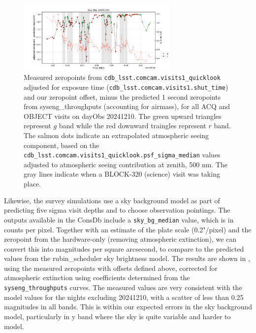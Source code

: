 \begin{figure}
    \centering
    \includegraphics[width=0.7\textwidth]{sp/zeropoints_dayobs_20241210.png}
    \caption{Measured zeropoints from \texttt{cdb\_lsst.comcam.visits1\_quicklook} adjusted for exposure time (\texttt{cdb\_lsst.comcam.visits1.shut\_time}) and our zeropoint offset, minus the predicted 1 second zeropoints from syseng\_throughputs (accounting for airmass), for all ACQ and OBJECT visits on dayObs 20241210. The green upward triangles represent $g$ band while the red downward traingles represent $r$ band. The salmon dots indicate an extrapolated atmospheric seeing component, based on the \texttt{cdb\_lsst.comcam.visits1\_quicklook.psf\_sigma\_median} values adjusted to atmospheric seeing contribution at zenith, 500 nm. The gray lines indicate when a BLOCK-320 (science) visit was taking place. }
    \label{fig:zeropoints_dayobs_20241210}
    \end{figure}


Likewise, the survey simulations use a sky background model as part of predicting five sigma visit depths and to choose observation pointings. The outputs available in the ConsDb include a \texttt{sky\_bg\_median} value, which is in counts per pixel. Together with an estimate of the plate scale (0.2"/pixel) and the zeropoint from the hardware-only (removing atmospheric extinction), we can convert this into magnitudes per square arcsecond, to compare to the predicted values from the rubin\_scheduler sky brightness model. The results are shown in , using the measured zeropoints with offsets defined above, corrected for atmospheric extinction using coefficients determined from the \texttt{syseng\_throughputs} curves. The measured values are very consistent with the model values for the nights excluding 20241210, with a scatter of less than 0.25 magnitudes in all bands. This is within our expected errors in the sky background model, particularly in y band where the sky is quite variable and harder to model.

